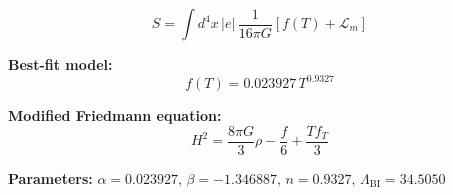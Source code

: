 
\begin{equation}
  S = \int d^4x \, |e| \, \frac{1}{16\pi G} \left[ f(T) + \mathcal{L}_m \right]
\end{equation}

\textbf{Best-fit model:}
\begin{equation}
  f(T) = 0.023927 \, T^{0.9327}
\end{equation}

\textbf{Modified Friedmann equation:}
\begin{equation}
  H^2 = \frac{8\pi G}{3} \rho - \frac{f}{6} + \frac{T f_T}{3}
\end{equation}

\textbf{Parameters:}
$\alpha = 0.023927$, \quad
$\beta = -1.346887$, \quad
$n = 0.9327$, \quad
$\Lambda_{\text{BI}} = 34.5050$